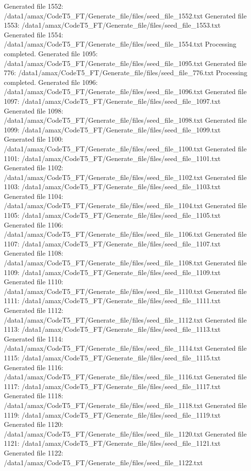 Generated file 1552: /data1/amax/CodeT5_FT/Generate_file/files/seed_file_1552.txt
Generated file 1553: /data1/amax/CodeT5_FT/Generate_file/files/seed_file_1553.txt
Generated file 1554: /data1/amax/CodeT5_FT/Generate_file/files/seed_file_1554.txt
Processing completed.
Generated file 1095: /data1/amax/CodeT5_FT/Generate_file/files/seed_file_1095.txt
Generated file 776: /data1/amax/CodeT5_FT/Generate_file/files/seed_file_776.txt
Processing completed.
Generated file 1096: /data1/amax/CodeT5_FT/Generate_file/files/seed_file_1096.txt
Generated file 1097: /data1/amax/CodeT5_FT/Generate_file/files/seed_file_1097.txt
Generated file 1098: /data1/amax/CodeT5_FT/Generate_file/files/seed_file_1098.txt
Generated file 1099: /data1/amax/CodeT5_FT/Generate_file/files/seed_file_1099.txt
Generated file 1100: /data1/amax/CodeT5_FT/Generate_file/files/seed_file_1100.txt
Generated file 1101: /data1/amax/CodeT5_FT/Generate_file/files/seed_file_1101.txt
Generated file 1102: /data1/amax/CodeT5_FT/Generate_file/files/seed_file_1102.txt
Generated file 1103: /data1/amax/CodeT5_FT/Generate_file/files/seed_file_1103.txt
Generated file 1104: /data1/amax/CodeT5_FT/Generate_file/files/seed_file_1104.txt
Generated file 1105: /data1/amax/CodeT5_FT/Generate_file/files/seed_file_1105.txt
Generated file 1106: /data1/amax/CodeT5_FT/Generate_file/files/seed_file_1106.txt
Generated file 1107: /data1/amax/CodeT5_FT/Generate_file/files/seed_file_1107.txt
Generated file 1108: /data1/amax/CodeT5_FT/Generate_file/files/seed_file_1108.txt
Generated file 1109: /data1/amax/CodeT5_FT/Generate_file/files/seed_file_1109.txt
Generated file 1110: /data1/amax/CodeT5_FT/Generate_file/files/seed_file_1110.txt
Generated file 1111: /data1/amax/CodeT5_FT/Generate_file/files/seed_file_1111.txt
Generated file 1112: /data1/amax/CodeT5_FT/Generate_file/files/seed_file_1112.txt
Generated file 1113: /data1/amax/CodeT5_FT/Generate_file/files/seed_file_1113.txt
Generated file 1114: /data1/amax/CodeT5_FT/Generate_file/files/seed_file_1114.txt
Generated file 1115: /data1/amax/CodeT5_FT/Generate_file/files/seed_file_1115.txt
Generated file 1116: /data1/amax/CodeT5_FT/Generate_file/files/seed_file_1116.txt
Generated file 1117: /data1/amax/CodeT5_FT/Generate_file/files/seed_file_1117.txt
Generated file 1118: /data1/amax/CodeT5_FT/Generate_file/files/seed_file_1118.txt
Generated file 1119: /data1/amax/CodeT5_FT/Generate_file/files/seed_file_1119.txt
Generated file 1120: /data1/amax/CodeT5_FT/Generate_file/files/seed_file_1120.txt
Generated file 1121: /data1/amax/CodeT5_FT/Generate_file/files/seed_file_1121.txt
Generated file 1122: /data1/amax/CodeT5_FT/Generate_file/files/seed_file_1122.txt
